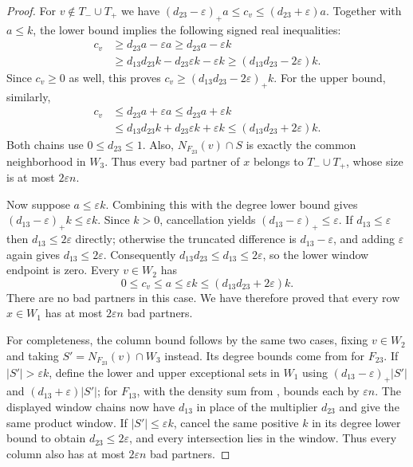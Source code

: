 \begin{proof}
For $v\notin T_-\cup T_+$ we have
$(d_{23}-\varepsilon)_+a\leq c_v\leq(d_{23}+\varepsilon)a$.
Together with $a\leq k$, the lower bound implies the following signed
real inequalities:
\[
 \begin{split}
 c_v&\geq d_{23}a-\varepsilon a
      \geq d_{23}a-\varepsilon k\\
    &\geq d_{13}d_{23}k-d_{23}\varepsilon k-\varepsilon k
      \geq(d_{13}d_{23}-2\varepsilon)k.
 \end{split}
\]
Since $c_v\geq0$ as well, this proves
$c_v\geq(d_{13}d_{23}-2\varepsilon)_+k$.
For the upper bound, similarly,
\[
 \begin{split}
 c_v&\leq d_{23}a+\varepsilon a
      \leq d_{23}a+\varepsilon k\\
    &\leq d_{13}d_{23}k+d_{23}\varepsilon k+\varepsilon k
      \leq(d_{13}d_{23}+2\varepsilon)k.
 \end{split}
\]
Both chains use $0\leq d_{23}\leq1$. Also,
$N_{F_{23}}(v)\cap S$ is exactly the common neighborhood in $W_3$.
Thus every bad partner of $x$ belongs to $T_-\cup T_+$, whose size
is at most $2\varepsilon n$.

Now suppose $a\leq\varepsilon k$. Combining this with the degree lower
bound gives $(d_{13}-\varepsilon)_+k\leq\varepsilon k$.
Since $k>0$, cancellation yields
$(d_{13}-\varepsilon)_+\leq\varepsilon$.
If $d_{13}\leq\varepsilon$ then $d_{13}\leq2\varepsilon$ directly;
otherwise the truncated difference is $d_{13}-\varepsilon$, and adding
$\varepsilon$ again gives $d_{13}\leq2\varepsilon$.
Consequently $d_{13}d_{23}\leq d_{13}\leq2\varepsilon$, so the lower
window endpoint is zero. Every $v\in W_2$ has
\[
 0\leq c_v\leq a\leq\varepsilon k
       \leq(d_{13}d_{23}+2\varepsilon)k.
\]
There are no bad partners in this case. We have therefore proved that
every row $x\in W_1$ has at most $2\varepsilon n$ bad partners.

For completeness, the column bound follows by the same two cases, fixing
$v\in W_2$ and taking $S'=N_{F_{23}}(v)\cap W_3$ instead.
Its degree bounds come from  for $F_{23}$.
If $|S'|>\varepsilon k$, define the lower and upper exceptional sets
in $W_1$ using $(d_{13}-\varepsilon)_+|S'|$ and
$(d_{13}+\varepsilon)|S'|$;  for $F_{13}$,
with the density sum from , bounds each by
$\varepsilon n$. The displayed window chains now have $d_{13}$
in place of the multiplier $d_{23}$ and give the same product window.
If $|S'|\leq\varepsilon k$, cancel the same positive $k$ in its
degree lower bound to obtain $d_{23}\leq2\varepsilon$, and every
intersection lies in the window. Thus every column also has at most
$2\varepsilon n$ bad partners.


\end{proof}
